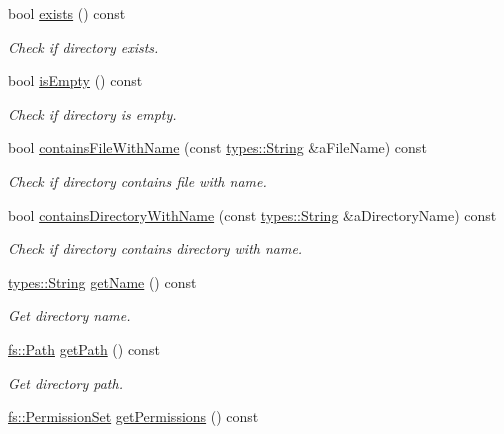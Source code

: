 \begin{DoxyCompactItemize}
bool \hyperlink{classlibrary_1_1core_1_1fs_1_1_directory_a1625670c9b94125ee6965ba8bce848fd}{exists} () const
\begin{DoxyCompactList}\small\item\em Check if directory exists. \end{DoxyCompactList}\item 
bool \hyperlink{classlibrary_1_1core_1_1fs_1_1_directory_af664c462ccd42a31c670c0304597c74a}{is\+Empty} () const
\begin{DoxyCompactList}\small\item\em Check if directory is empty. \end{DoxyCompactList}\item 
bool \hyperlink{classlibrary_1_1core_1_1fs_1_1_directory_a0d326fef28dfbb21702a12af9701ed50}{contains\+File\+With\+Name} (const \hyperlink{classlibrary_1_1core_1_1types_1_1_string}{types\+::\+String} \&a\+File\+Name) const
\begin{DoxyCompactList}\small\item\em Check if directory contains file with name. \end{DoxyCompactList}\item 
bool \hyperlink{classlibrary_1_1core_1_1fs_1_1_directory_abf702bc8f107d3e4eefe15579861b8e3}{contains\+Directory\+With\+Name} (const \hyperlink{classlibrary_1_1core_1_1types_1_1_string}{types\+::\+String} \&a\+Directory\+Name) const
\begin{DoxyCompactList}\small\item\em Check if directory contains directory with name. \end{DoxyCompactList}\item 
\hyperlink{classlibrary_1_1core_1_1types_1_1_string}{types\+::\+String} \hyperlink{classlibrary_1_1core_1_1fs_1_1_directory_acc2dd0ae02ee3733bf20f93ac1d05a56}{get\+Name} () const
\begin{DoxyCompactList}\small\item\em Get directory name. \end{DoxyCompactList}\item 
\hyperlink{classlibrary_1_1core_1_1fs_1_1_path}{fs\+::\+Path} \hyperlink{classlibrary_1_1core_1_1fs_1_1_directory_a94b153cbebbcc5ac6db64ec3aee63901}{get\+Path} () const
\begin{DoxyCompactList}\small\item\em Get directory path. \end{DoxyCompactList}\item 
\hyperlink{classlibrary_1_1core_1_1fs_1_1_permission_set}{fs\+::\+Permission\+Set} \hyperlink{classlibrary_1_1core_1_1fs_1_1_directory_a2214a988c6a3d2b168768d83dfa17225}{get\+Permissions} () const

\end{DoxyCompactItemize}
